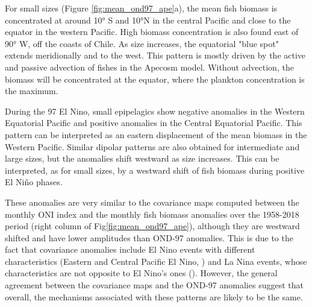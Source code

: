 For small sizes (Figure \ref{fig:mean_ond97_ape}a), the mean fish biomass is concentrated at around 10° S and 10°N in the central Pacific and close to the equator in the western Pacific. High biomass concentration is also found east of 90° W, off the coasts of Chile. As size increases, the equatorial "blue spot" extends meridionally and to the west. This pattern is mostly driven by the active and passive advection of fishes in the Apecosm model. Without advection, the biomass will be concentrated at the equator, where the plankton concentration is the maximum.

During the 97 El Nino, small epipelagics show negative anomalies in the Western Equatorial Pacific and positive anomalies in the Central Equatorial Pacific. This pattern can be interpreted as an eastern displacement of the mean biomass in the Western Pacific. Similar dipolar patterns are also obtained for intermediate and large sizes, but the anomalies shift westward as size increases. This can be interpreted, as for small sizes, by a westward shift of fish biomass during positive El Niño phases.

These anomalies are very similar to the covariance maps computed between the monthly ONI index and the monthly fish biomass anomalies over the 1958-2018 period (right column of Fig\ref{fig:mean_ond97_ape}), although they are westward shifted and have lower amplitudes than OND-97 anomalies. This is due to the fact that covariance anomalies include El Nino events with different characteristics (Eastern and Central Pacific El Nino, )  and La Nina events, whose characteristics are not opposite to El Nino's ones (). However, the general agreement between the covariance maps and the OND-97 anomalies suggest that overall, the mechanisms associated with these patterns are likely to be the same.

